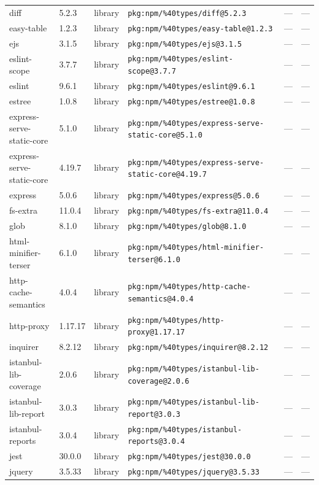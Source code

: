 \documentclass[11pt]{article}
\begin{document}
\begin{longtable}{|l|l|l|p{2.2cm}|l|p{4cm}|}
diff & 5.2.3 & library & \texttt{pkg:npm/\%40types/diff@5.2.3} & — & — \\
easy-table & 1.2.3 & library & \texttt{pkg:npm/\%40types/easy-table@1.2.3} & — & — \\
ejs & 3.1.5 & library & \texttt{pkg:npm/\%40types/ejs@3.1.5} & — & — \\
eslint-scope & 3.7.7 & library & \texttt{pkg:npm/\%40types/eslint-scope@3.7.7} & — & — \\
eslint & 9.6.1 & library & \texttt{pkg:npm/\%40types/eslint@9.6.1} & — & — \\
estree & 1.0.8 & library & \texttt{pkg:npm/\%40types/estree@1.0.8} & — & — \\
express-serve-static-core & 5.1.0 & library & \texttt{pkg:npm/\%40types/express-serve-static-core@5.1.0} & — & — \\
express-serve-static-core & 4.19.7 & library & \texttt{pkg:npm/\%40types/express-serve-static-core@4.19.7} & — & — \\
express & 5.0.6 & library & \texttt{pkg:npm/\%40types/express@5.0.6} & — & — \\
fs-extra & 11.0.4 & library & \texttt{pkg:npm/\%40types/fs-extra@11.0.4} & — & — \\
glob & 8.1.0 & library & \texttt{pkg:npm/\%40types/glob@8.1.0} & — & — \\
html-minifier-terser & 6.1.0 & library & \texttt{pkg:npm/\%40types/html-minifier-terser@6.1.0} & — & — \\
http-cache-semantics & 4.0.4 & library & \texttt{pkg:npm/\%40types/http-cache-semantics@4.0.4} & — & — \\
http-proxy & 1.17.17 & library & \texttt{pkg:npm/\%40types/http-proxy@1.17.17} & — & — \\
inquirer & 8.2.12 & library & \texttt{pkg:npm/\%40types/inquirer@8.2.12} & — & — \\
istanbul-lib-coverage & 2.0.6 & library & \texttt{pkg:npm/\%40types/istanbul-lib-coverage@2.0.6} & — & — \\
istanbul-lib-report & 3.0.3 & library & \texttt{pkg:npm/\%40types/istanbul-lib-report@3.0.3} & — & — \\
istanbul-reports & 3.0.4 & library & \texttt{pkg:npm/\%40types/istanbul-reports@3.0.4} & — & — \\
jest & 30.0.0 & library & \texttt{pkg:npm/\%40types/jest@30.0.0} & — & — \\
jquery & 3.5.33 & library & \texttt{pkg:npm/\%40types/jquery@3.5.33} & — & — \\

\end{longtable}
\end{document}
